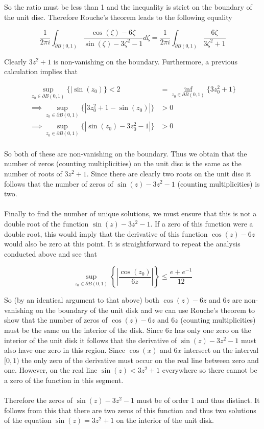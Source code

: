 \documentclass{article}
\begin{document}
So the ratio must be less than 1 and the inequality is strict on the boundary of the unit disc. Therefore Rouche's theorem leads to 
the following equality

\begin{equation*}
    \frac{1}{2\pi i}\int_{\partial B(0,1)}\frac{\cos(\zeta) -6\zeta}{\sin(\zeta) - 3\zeta^2-1}d\zeta = \frac{1}{2\pi i}\int_{\partial B(0,1)}\frac{6\zeta}{3\zeta^2+1}
\end{equation*}

Clearly $3z^2+1$ is non-vanishing on the boundary. Furthermore, a previous calculation implies that 

\begin{align*}
    \sup_{z_0 \in \partial B(0,1)}\{|\sin(z_0)\} < 2 &= \inf_{z_0 \in \partial B(0,1)}\{3z_0^2+1\} \\
    \implies \sup_{z_0 \in \partial B(0,1)}\{|3z_0^2+1-\sin(z_0)|\} &> 0 \\
    \implies \sup_{z_0 \in \partial B(0,1)}\{|\sin(z_0)-3z_0^2-1|\} &> 0 \\
\end{align*}

So both of these are non-vanishing on the boundary. Thus we obtain that the number of zeros (counting multiplicities) 
on the unit disc is the same as the number of roots of $3z^2+1$. Since there are clearly two 
roots on the unit disc it follows that the number of zeros of $\sin(z) -3z^2-1$ (counting multiplicities) 
is two.

\paragraph{}
Finally to find the number of unique solutions, we must ensure that this is not a double root of 
the function $\sin(z)-3z^2-1$. If a zero of this function were a double root, this would imply that 
the derivative of this function $\cos(z)-6z$ would also be zero at this point. It is straightforward to 
repeat the analysis conducted above and see that 

\begin{equation*}
    \sup_{z_0 \in \partial B(0,1)}\left\{\left|\frac{\cos(z_0)}{6z}\right|\right\} \leq \frac{e+e^{-1}}{12}
\end{equation*}

So (by an identical argument to that above) both $\cos(z)-6z$ and $6z$ are non-vanishing on the boundary of the unit disk and we can use Rouche's theorem to 
show that the number of zeros of $\cos(z)-6z$ and $6z$ (counting multiplicities) must be the same 
on the interior of the disk. Since $6z$ has only one zero on the interior of the unit disk it follows 
that the derivative of $\sin(z)-3z^2-1$ must also have one zero in this region. Since $\cos(x)$ and 
$6x$ intersect on the interval $[0,1)$ the only zero of the derivative must occur on the real line 
between zero and one. However, on the real line $\sin(z) < 3z^2+1$ everywhere so there cannot be a 
zero of the function in this segment. 

\paragraph{}
Therefore the zeros of $\sin(z)-3z^2-1$ must be of order 1 and thus distinct. It follows from this 
that there are two zeros of this function and thus two solutions of the equation $\sin(z) = 3z^2+1$ 
on the interior of the unit disk.
\end{document}
